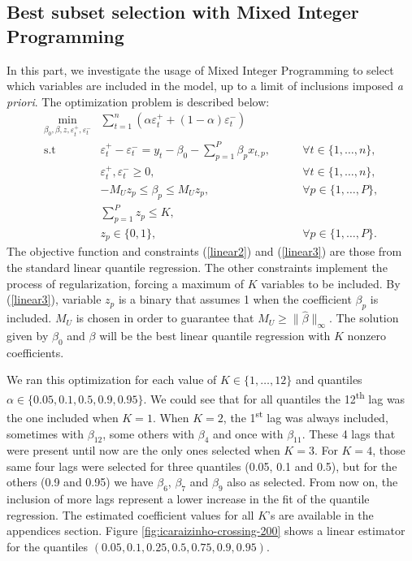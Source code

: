 \subsection{Best subset selection with Mixed Integer Programming}
\label{sec:best-subset-mip}

In this part, we investigate the usage of Mixed Integer Programming to select which variables are included in the model, up to a limit of inclusions imposed \textit{a priori}. The optimization problem is described below:
\begin{eqnarray}
\min_{\beta_{0},\beta, z,\varepsilon_{t}^{+},\varepsilon_{t}^{-}} &  \sum_{t=1}^{n}\left(\alpha\varepsilon_{t}^{+}+(1-\alpha)\varepsilon_{t}^{-}\right) \\
\mbox{s.t } & \varepsilon_{t}^{+}-\varepsilon_{t}^{-}=y_{t}-\beta_{0}-\sum_{p=1}^{P}\beta_{p}x_{t,p},& \qquad\forall t\in\{1,\dots,n\}, \label{linear1}\\
 & \varepsilon_{t}^{+},\varepsilon_{t}^{-}\geq0,&\qquad\forall t \in \{1,\dots,n\}, \label{linear2}\\
 & - M_U z_p \leq \beta_p \leq M_U z_p,&\qquad\forall p\in\{1,\dots,P\}, \label{linear3}\\
 & \sum_{p=1}^P z_p \leq K, \label{linear4}\\
 & z_p \in \{0,1\},&\qquad\forall p\in\{1,\dots,P\}. \label{eq:linear5}
\end{eqnarray}
The objective function and constraints (\ref{linear2}) and (\ref{linear3}) are those from the standard linear quantile regression. The other constraints implement the process of regularization, forcing a maximum of $K$ variables to be included. By (\ref{linear3}), variable $z_p$ is a binary that assumes 1 when the coefficient $\beta_p$ is included. $M_U$ is chosen in order to guarantee that $M_U \geq \|\hat{\beta}\|_{\infty}$. The solution given by $\beta_0$ and $\beta$ will be the best linear quantile regression with $K$ nonzero coefficients. 

We ran this optimization for each value of $K \in \{1, \dots, 12\}$ and quantiles $\alpha \in \{0.05, 0.1, 0.5, 0.9, 0.95\}$. We could see that for all quantiles the 12\textsuperscript{th} lag was the one included when $K=1$. When $K=2$, the 1\textsuperscript{st} lag was always included, sometimes with $\beta_{12}$, some others with $\beta_4$ and once with $\beta_{11}$. These 4 lags that were present until now are the only ones selected when $K=3$. For $K=4$, those same four lags were selected for three quantiles (0.05, 0.1 and 0.5), but for the others (0.9 and 0.95) we have $\beta_6$, $\beta_7$ and $\beta_9$ also as selected. From now on, the inclusion of more lags represent a lower increase in the fit of the quantile regression. The estimated coefficient values for all $K$'s are available in the appendices section. Figure \ref{fig:icaraizinho-crossing-200} shows a linear estimator for the quantiles $(0.05, 0.1, 0.25, 0.5, 0.75, 0.9, 0.95)$.

